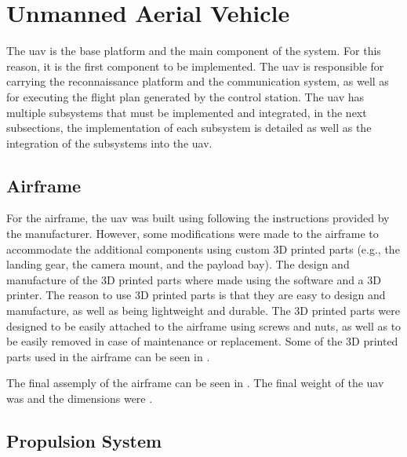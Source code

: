 \section{Unmanned Aerial Vehicle}\label{sec:implementation_uav}

The \gls{uav} is the base platform and the main component of the system. For this reason, it is the first component to be implemented. The \gls{uav} is responsible for carrying the reconnaissance platform and the communication system, as well as for executing the flight plan generated by the control station. The \gls{uav} has multiple subsystems that must be implemented and integrated, in the next subsections, the implementation of each subsystem is detailed as well as the integration of the subsystems into the \gls{uav}.

\subsection{Airframe}\label{subsec:implementation_airframe}

For the airframe, the \gls{uav} was built using following the instructions provided by the manufacturer. However, some modifications were made to the airframe to accommodate the additional components using custom 3D printed parts (e.g., the landing gear, the camera mount, and the payload bay). The design and manufacture of the 3D printed parts where made using the  software and a  3D printer. The reason to use 3D printed parts is that they are easy to design and manufacture, as well as being lightweight and durable. The 3D printed parts were designed to be easily attached to the airframe using screws and nuts, as well as to be easily removed in case of maintenance or replacement. Some of the 3D printed parts used in the airframe can be seen in .


The final assemply of the airframe can be seen in . The final weight of the \gls{uav} was  and the dimensions were .


\subsection{Propulsion System}\label{subsec:implementation_propulsion_system}

